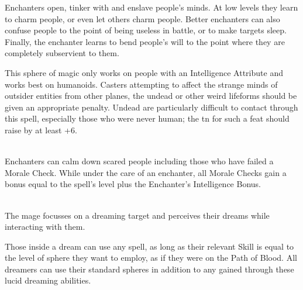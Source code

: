 \begin{multicols}{2}

\noindent
Enchanters open, tinker with and enslave people's minds. At low levels they learn to charm people, or even let others charm people. Better enchanters can also confuse people to the point of being useless in battle, or to make targets sleep. Finally, the enchanter learns to bend people's will to the point where they are completely subservient to them.

This sphere of magic only works on people with an Intelligence Attribute and works best on humanoids. Casters attempting to affect the strange minds of outsider entities from other planes, the undead or other weird lifeforms should be given an appropriate penalty. Undead are particularly difficult to contact through this spell, especially those who were never human; the \gls{tn} for such a feat should raise by at least +6.

\spelllevel

\\
Enchanters can calm down scared people including those who have failed a Morale Check.
While under the care of an enchanter, all Morale Checks gain a bonus equal to the spell's level plus the Enchanter's Intelligence Bonus.

\\
The mage focusses on a dreaming target and perceives their dreams while interacting with them.

Those inside a dream can use any spell, as long as their relevant Skill is equal to the level of sphere they want to employ, as if they were on the Path of Blood.
\iftoggle{verbose}{%
	For example, someone with Survival 1 can use Plantform from the Aldaron sphere (which is a level 1 spell, and uses the Survival Skill).
	Someone with Empathy 2 could use the Enchantment spells \textit{Calm}, and \textit{Focus}, but not \textit{Sleep} (as this is a level 3 spell.)

	Spells which have variable Skills, such as \textit{illusion}, are generally available.
	Someone with Beast Ken would be able to cast illusions of animals, and someone with Crafts would be able to make an illusion of a chest.

	Everyone's total \glspl{mp} determine their Metamagic ability, as usual.
}{}
All dreamers can use their standard spheres in addition to any gained through these lucid dreaming abilities.


\end{multicols}
